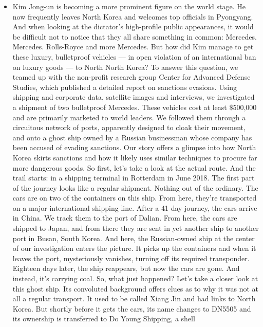 \begin{itemize}
\tightlist
\item
  Kim Jong-un is becoming a more prominent figure on the world stage. He
  now frequently leaves North Korea and welcomes top officials in
  Pyongyang. And when looking at the dictator's high-profile public
  appearances, it would be difficult not to notice that they all share
  something in common: Mercedes. Mercedes. Rolls-Royce and more
  Mercedes. But how did Kim manage to get these luxury, bulletproof
  vehicles --- in open violation of an international ban on luxury goods
  --- to North North Korea? To answer this question, we teamed up with
  the non-profit research group Center for Advanced Defense Studies,
  which published a detailed report on sanctions evasions. Using
  shipping and corporate data, satellite images and interviews, we
  investigated a shipment of two bulletproof Mercedes. These vehicles
  cost at least \$500,000 and are primarily marketed to world leaders.
  We followed them through a circuitous network of ports, apparently
  designed to cloak their movement, and onto a ghost ship owned by a
  Russian businessman whose company has been accused of evading
  sanctions. Our story offers a glimpse into how North Korea skirts
  sanctions and how it likely uses similar techniques to procure far
  more dangerous goods. So first, let's take a look at the actual route.
  And the trail starts: in a shipping terminal in Rotterdam in June
  2018. The first part of the journey looks like a regular shipment.
  Nothing out of the ordinary. The cars are on two of the containers on
  this ship. From here, they're transported on a major international
  shipping line. After a 41 day journey, the cars arrive in China. We
  track them to the port of Dalian. From here, the cars are shipped to
  Japan, and from there they are sent in yet another ship to another
  port in Busan, South Korea. And here, the Russian-owned ship at the
  center of our investigation enters the picture. It picks up the
  containers and when it leaves the port, mysteriously vanishes, turning
  off its required transponder. Eighteen days later, the ship reappears,
  but now the cars are gone. And instead, it's carrying coal. So, what
  just happened? Let's take a closer look at this ghost ship. Its
  convoluted background offers clues as to why it was not at all a
  regular transport. It used to be called Xiang Jin and had links to
  North Korea. But shortly before it gets the cars, its name changes to
  DN5505 and its ownership is transferred to Do Young Shipping, a shell

\end{itemize}
